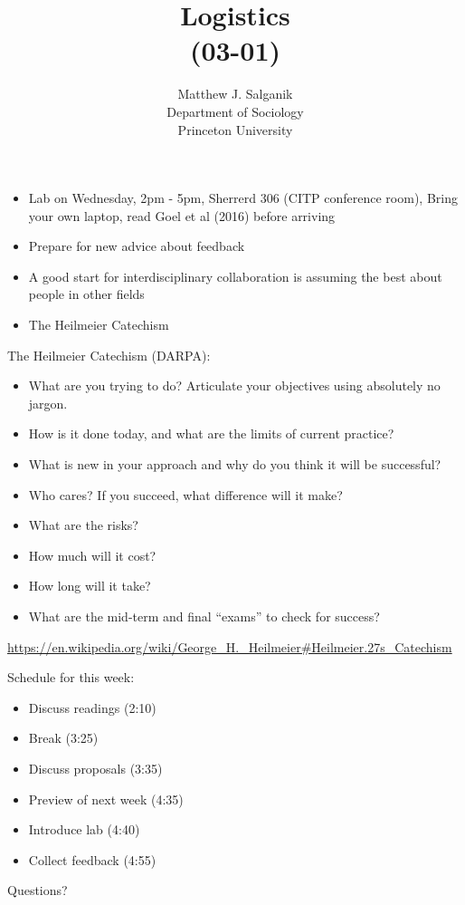 \documentclass[aspectratio=169]{beamer}
\title[]{Logistics\\(03-01)}
\author[]{Matthew J. Salganik\\Department of Sociology\\Princeton University}
\date[]{Soc 596: Computational Social Science\\Fall 2016
\vfill
\begin{flushright}
\vspace{0.6in}
\texttt{[image: figures/cc.png]}
\end{flushright}
}
\def\vf{\vfill}
\begin{document}
\frame{\titlepage}
\begin{frame}

\begin{itemize}
\item Lab on Wednesday, 2pm - 5pm, Sherrerd 306 (CITP conference room), Bring your own laptop, read Goel et al (2016) before arriving
\pause
\item Prepare for new advice about feedback
\pause
\item A good start for interdisciplinary collaboration is assuming the best about people in other fields
\pause
\item The Heilmeier Catechism
\pause
\end{itemize}

\end{frame}
\begin{frame}

The Heilmeier Catechism (DARPA):\\

\begin{itemize}
\item What are you trying to do? Articulate your objectives using absolutely no jargon.
\item How is it done today, and what are the limits of current practice?
\item What is new in your approach and why do you think it will be successful?
\item Who cares? If you succeed, what difference will it make?
\item What are the risks?
\item How much will it cost?
\item How long will it take?
\item What are the mid-term and final ``exams'' to check for success?
\end{itemize}

\vf

\tiny{\url{https://en.wikipedia.org/wiki/George\_H.\_Heilmeier\#Heilmeier.27s\_Catechism}}

\end{frame}
\begin{frame}

Schedule for this week:
\begin{itemize}
\item Discuss readings (2:10)
\item Break (3:25)
\item Discuss proposals (3:35)
\item Preview of next week (4:35)
\item Introduce lab (4:40)
\item Collect feedback (4:55)
\end{itemize}

\vf
Questions?

\end{frame}
\end{document}
